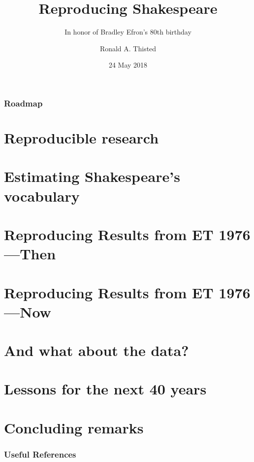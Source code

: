 \documentclass[xcolor=dvipsnames]{beamer}
\title[]
{Reproducing Shakespeare}
\subtitle
{In honor of Bradley Efron's 80th birthday}
\author{Ronald A. Thisted}
\institute[The University of Chicago] %
{
  Departments of Statistics and Public Health Sciences\\
  The University of Chicago
}
\date
{24 May 2018}
\begin{document}
\begin{frame}
  \titlepage
\end{frame}
	

\begin{frame}
  \frametitle{Roadmap}
  \tableofcontents
\end{frame}

\section[Repro Res]{Reproducible research}
	
\section[S's vocabulary]{Estimating Shakespeare's vocabulary}
	
	
	
\section[Then]{Reproducing Results from ET 1976---Then}
	
	
	
	
	
	
	
\section[Now]{Reproducing Results from ET 1976---Now}
	
	
	
\section[Data]{And what about the data?}
	
\section[Lessons]{Lessons for the next 40 years}
	
\section[Finally]{Concluding remarks}
	

%	



\begin{frame}
    \frametitle{Useful References}\tiny
       
\end{frame}
\nocite{Spevack:1968qd,Efron:1976zs,knuth1984literate,Gani:1976rg,Buckheit:1995hl}
\end{document}
